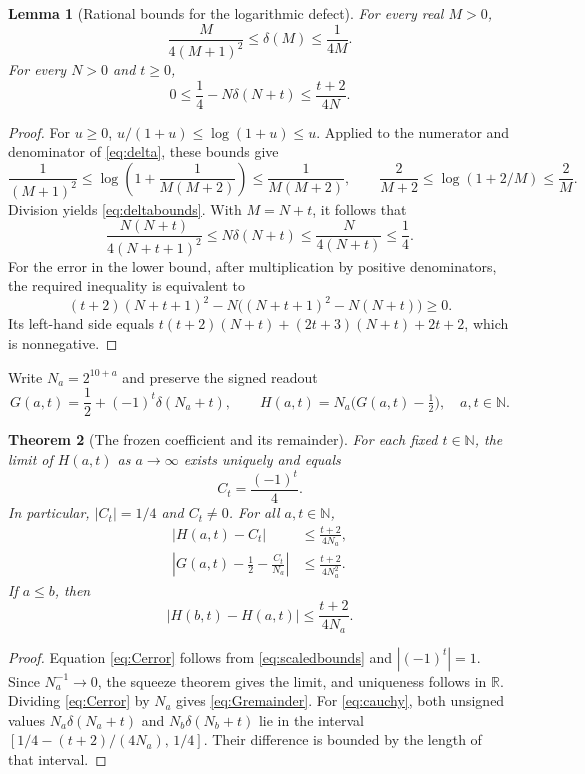 \documentclass[11pt,a4paper]{article}
\newtheorem{theorem}{Theorem}[section]
\newtheorem{lemma}[theorem]{Lemma}
\theoremstyle{definition}
\theoremstyle{remark}
\newcommand{\N}{\mathbb N}
\newcommand{\R}{\mathbb R}
\begin{document}
\begin{lemma}[Rational bounds for the logarithmic defect]
\label{lem:delta}
For every real $M>0$,
\begin{equation}
 \frac{M}{4(M+1)^2}\le\delta(M)\le\frac1{4M}.
 \label{eq:deltabounds}
\end{equation}
For every $N>0$ and $t\ge0$,
\begin{equation}
 0\le\frac14-N\delta(N+t)\le\frac{t+2}{4N}.
 \label{eq:scaledbounds}
\end{equation}
\end{lemma}
\begin{proof}
For $u\ge0$, $u/(1+u)\le\log(1+u)\le u$.
Applied to the numerator and denominator of \eqref{eq:delta}, these
bounds give
\[
 \frac1{(M+1)^2}\le
 \log\!\left(1+\frac1{M(M+2)}\right)\le\frac1{M(M+2)},
 \qquad
 \frac2{M+2}\le\log(1+2/M)\le\frac2M.
\]
Division yields \eqref{eq:deltabounds}. With $M=N+t$, it follows that
\[
 \frac{N(N+t)}{4(N+t+1)^2}
       \le N\delta(N+t)\le\frac{N}{4(N+t)}\le\frac14.
\]
For the error in the lower bound, after multiplication by positive
denominators, the required inequality is equivalent to
\[
 (t+2)(N+t+1)^2
   -N\bigl((N+t+1)^2-N(N+t)\bigr)\ge0.
\]
Its left-hand side equals
$t(t+2)(N+t)+(2t+3)(N+t)+2t+2$, which is nonnegative.
\end{proof}

Write $N_a=2^{10+a}$ and preserve the signed readout
\begin{equation}
 G(a,t)=\frac12+(-1)^t\delta(N_a+t),\qquad
 H(a,t)=N_a\bigl(G(a,t)-\tfrac12\bigr),
 \quad a,t\in\N.
 \label{eq:dyadic}
\end{equation}

\begin{theorem}[The frozen coefficient and its remainder]
\label{thm:coefficient}
For each fixed $t\in\N$, the limit of $H(a,t)$ as $a\to\infty$ exists
uniquely and equals
\begin{equation}
 C_t=\frac{(-1)^t}{4}.
 \label{eq:Ct}
\end{equation}
In particular, $|C_t|=1/4$ and $C_t\ne0$. For all $a,t\in\N$,
\begin{align}
 |H(a,t)-C_t|&\le\frac{t+2}{4N_a}, \label{eq:Cerror}\\
 \left|G(a,t)-\frac12-\frac{C_t}{N_a}\right|
       &\le\frac{t+2}{4N_a^2}. \label{eq:Gremainder}
\end{align}
If $a\le b$, then
\begin{equation}
 |H(b,t)-H(a,t)|\le\frac{t+2}{4N_a}.
 \label{eq:cauchy}
\end{equation}
\end{theorem}
\begin{proof}
Equation \eqref{eq:Cerror} follows from \eqref{eq:scaledbounds}
and $|(-1)^t|=1$. Since $N_a^{-1}\to0$, the squeeze theorem gives
the limit, and uniqueness follows in $\R$.
Dividing \eqref{eq:Cerror} by $N_a$ gives
\eqref{eq:Gremainder}.
For \eqref{eq:cauchy}, both unsigned values
$N_a\delta(N_a+t)$ and $N_b\delta(N_b+t)$ lie in the interval
$[1/4-(t+2)/(4N_a),\,1/4]$. Their difference is bounded by the
length of that interval.
\end{proof}
\end{document}
